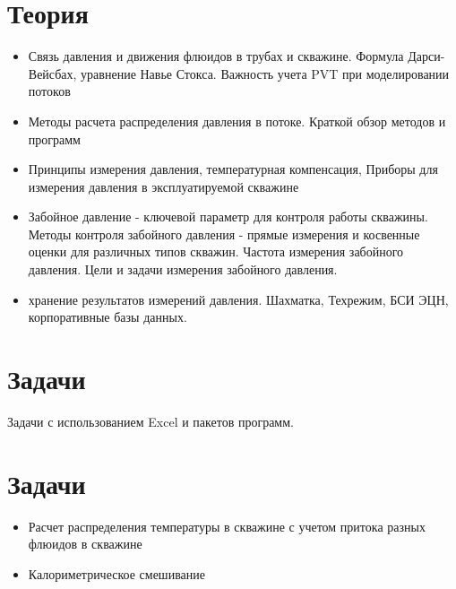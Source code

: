 \section{Теория}
\begin{itemize}
    \item Связь давления и движения флюидов в трубах и скважине. Формула Дарси-Вейсбах, уравнение Навье Стокса. Важность учета PVT при моделировании потоков
    \item Методы расчета распределения давления в потоке. Краткой обзор методов и программ
    \item Принципы измерения давления, температурная компенсация, Приборы для измерения давления в эксплуатируемой скважине
    \item Забойное давление - ключевой параметр для контроля работы скважины. Методы контроля забойного давления - прямые измерения и косвенные оценки для различных типов скважин. Частота измерения забойного давления. Цели и задачи измерения забойного давления.
    \item хранение результатов измерений давления. Шахматка, Техрежим, БСИ ЭЦН, корпоративные базы данных.
\end{itemize}

\section{Задачи}

Задачи с использованием Excel и пакетов программ. 

\section{Задачи}
\begin{itemize}
    \item Расчет распределения температуры в скважине с учетом притока разных флюидов в скважине
    \item Калориметрическое смешивание
    
\end{itemize}

